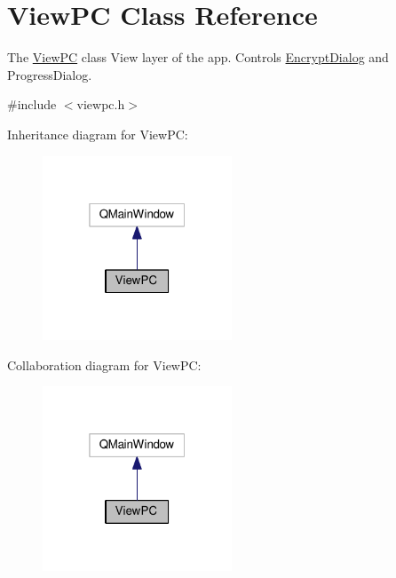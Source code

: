 \hypertarget{class_view_p_c}{\section{View\-P\-C Class Reference}
\label{class_view_p_c}
}


The \hyperlink{class_view_p_c}{View\-P\-C} class View layer of the app. Controls \hyperlink{class_encrypt_dialog}{Encrypt\-Dialog} and Progress\-Dialog.  




{\ttfamily \#include $<$viewpc.\-h$>$}



Inheritance diagram for View\-P\-C\-:
\nopagebreak
\begin{figure}[H]
\begin{center}
\leavevmode
\includegraphics[width=160pt]{class_view_p_c__inherit__graph}
\end{center}
\end{figure}


Collaboration diagram for View\-P\-C\-:
\nopagebreak
\begin{figure}[H]
\begin{center}
\leavevmode
\includegraphics[width=160pt]{class_view_p_c__coll__graph}
\end{center}
\end{figure}
